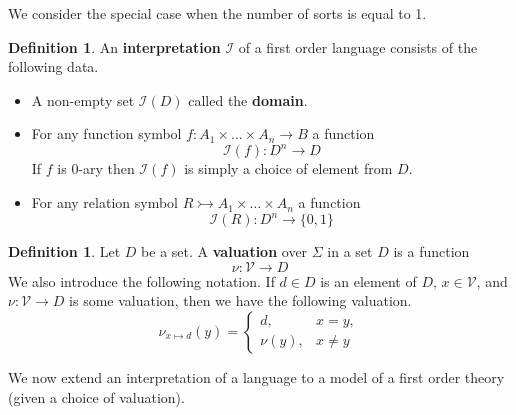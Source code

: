 \documentclass[12pt]{article}
\theoremstyle{plain}
\theoremstyle{definition}
\newtheorem{defn}[thm]{Definition} %
\newcommand{\call}[1]{\mathcal{#1}}
\newcommand{\lto}{\longrightarrow}
\begin{document}
We consider the special case when the number of sorts is equal to 1.
\begin{defn}
	An \textbf{interpretation} $\call{I}$ of a first order language consists of the following data.
	\begin{itemize}
		\item A non-empty set $\call{I}(D)$ called the \textbf{domain}.
		\item For any function symbol $f: A_1 \times \hdots \times A_n \lto B$ a function
		\begin{equation}
			\call{I}(f): D^n \lto D
		\end{equation}
		If $f$ is $0$-ary then $\call{I}(f)$ is simply a choice of element from $D$.
		\item For any relation symbol $R \rightarrowtail A_1 \times \hdots \times A_n$ a function
		\begin{equation}
			\call{I}(R): D^n \lto \lbrace 0,1\rbrace
		\end{equation}
	\end{itemize}
\end{defn}

\begin{defn}
	Let $D$ be a set. A \textbf{valuation} over $\Sigma$ in a set $D$ is a function
	\begin{equation}
		\nu: \call{V} \lto D
	\end{equation}
	We also introduce the following notation. If $d \in D$ is an element of $D$, $x \in \call{V}$, and $\nu: \call{V} \lto D$ is some valuation, then we have the following valuation.
	\begin{equation}
		\nu_{x \mapsto d}(y) =
		\begin{cases}
			d, & x = y,\\
			\nu(y), & x \neq y
		\end{cases}
	\end{equation}
\end{defn}
We now extend an interpretation of a language to a model of a first order theory (given a choice of valuation).
\end{document}
